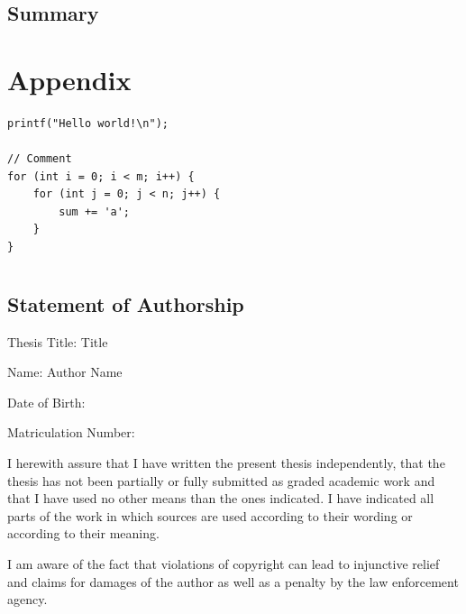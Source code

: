 \documentclass[
	12pt,
	a4paper,
	abstract,
	bibliography=totoc,
	chapterprefix,
	headings=openright,
	numbers=endperiod,
	parskip=half,
	twoside,
]{scrreprt}
\newcommand{\parcioTitle}{Title}
\newcommand{\parcioName}{Author Name}
\begin{document}
\lipsum[1-2]

\section*{Summary}

\lipsum[2]





\appendix

\chapter{Appendix}
\label{cha:appendix}

\begin{listing}[ht]
\begin{verbatim}
printf("Hello world!\n");

// Comment
for (int i = 0; i < m; i++) {
	for (int j = 0; j < n; j++) {
		sum += 'a';
	}
}
\end{verbatim}
\caption{Caption}
\end{listing}

\chapter*{}

\section*{Statement of Authorship}

Thesis Title: \parcioTitle

\bigskip
\bigskip

Name: \parcioName

\bigskip

Date of Birth:

\bigskip

Matriculation Number:

\bigskip
\bigskip

I herewith assure that I have written the present thesis independently, that the thesis has not been partially or fully submitted as graded academic work and that I have used no other means than the ones indicated.
I have indicated all parts of the work in which sources are used according to their wording or according to their meaning.

I am aware of the fact that violations of copyright can lead to injunctive relief and claims for damages of the author as well as a penalty by the law enforcement agency.
\end{document}
